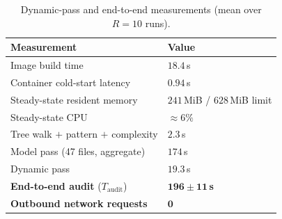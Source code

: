 \begin{table}[!htbp]
  \centering
  \caption{Dynamic-pass and end-to-end measurements
           (mean over $R=10$ runs).}
  \label{tab:perf}
  \renewcommand{\arraystretch}{1.15}
  \small
  \begin{tabular}{@{}l l@{}}
    \toprule
    \textbf{Measurement} & \textbf{Value} \\
    \midrule
    Image build time             & $18.4$\,s \\
    Container cold-start latency  & $0.94$\,s \\
    Steady-state resident memory  & $241$\,MiB / $628$\,MiB limit \\
    Steady-state CPU              & $\approx 6\%$ \\
    \midrule
    Tree walk $+$ pattern $+$ complexity & $2.3$\,s \\
    Model pass (47 files, aggregate)     & $174$\,s \\
    Dynamic pass                         & $19.3$\,s \\
    \textbf{End-to-end audit} ($T_{\text{audit}}$) & $\mathbf{196 \pm 11}$\,\textbf{s} \\
    \textbf{Outbound network requests}   & $\mathbf{0}$ \\
    \bottomrule
  \end{tabular}
\end{table}
